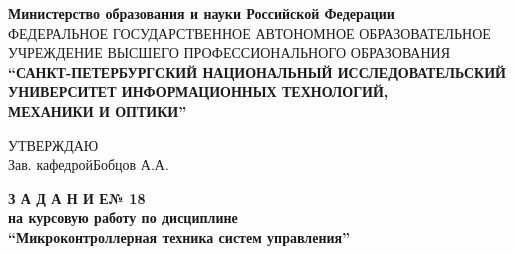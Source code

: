 \documentclass[fleqn, a4paper, 12pt, russian]{article}
\begin{document}
	\centering
	{\fontsize{14pt}{5cm}\selectfont \bfseries Министерство образования и науки Российской Федерации} \\ \vspace{0.5cm}
	{\fontsize{6.8pt}{5cm}\selectfont ФЕДЕРАЛЬНОЕ ГОСУДАРСТВЕННОЕ АВТОНОМНОЕ ОБРАЗОВАТЕЛЬНОЕ УЧРЕЖДЕНИЕ ВЫСШЕГО ПРОФЕССИОНАЛЬНОГО ОБРАЗОВАНИЯ} \\ 
	\vspace{0.5cm}
	{\fontsize{13pt}{5cm}\selectfont \bfseries “САНКТ-ПЕТЕРБУРГСКИЙ НАЦИОНАЛЬНЫЙ ИССЛЕДОВАТЕЛЬСКИЙ УНИВЕРСИТЕТ ИНФОРМАЦИОННЫХ ТЕХНОЛОГИЙ,} \\ \vspace{0.1cm}
	{\fontsize{13pt}{5cm}\selectfont \bfseries МЕХАНИКИ И ОПТИКИ”} \\ \vspace{1cm}
	
	\flushleft
	{\fontsize{12pt}{0cm} \hspace{1.6cm}УТВЕРЖДАЮ} \\ \vspace{0.1cm}
	{\fontsize{12pt}{0cm}\selectfont \hspace{10.5cm}Зав. кафедрой\hspace{0.6cm}Бобцов А.А.} \\ \vspace{1cm}
	
	\centering
	{\fontsize{18pt}{0cm}\selectfont \bfseries З А Д А Н И Е\hspace{0.2cm}№ 18}\\ \vspace{0.2cm}
	{\fontsize{16pt}{0cm}\selectfont \bfseries на курсовую работу по дисциплине}	\\ \vspace{0.2cm}
	{\fontsize{16pt}{0cm}\selectfont \bfseries \enquote{Микроконтроллерная техника систем управления}} \\ \vspace{1cm}
	
\end{document}
